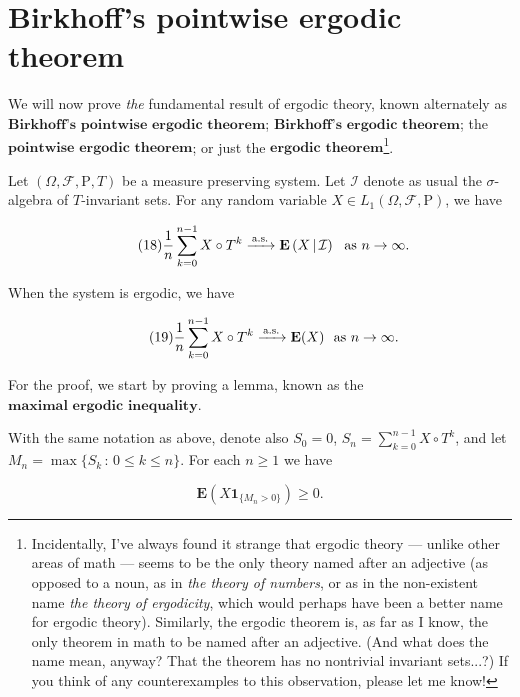 \section{Birkhoff's pointwise ergodic theorem}
We will now prove \emph{the} fundamental result of ergodic
theory, known alternately as
$\textbf{Birkhoff's pointwise ergodic theorem}$;
$\textbf{Birkhoff's ergodic theorem}$; the
$\textbf{pointwise ergodic theorem}$; or just the
$\textbf{ergodic theorem}$\footnote{Incidentally, I've always found it strange that
ergodic theory --- unlike other areas of math ---
seems to be the only theory named after an adjective
(as opposed to a noun, as in \emph{the theory of numbers},
or as in the non-existent name \emph{the theory of
ergodicity}, which would perhaps have been a better
name for ergodic theory). Similarly, the ergodic
theorem is, as far as I know, the only theorem in math
to be named after an adjective. (And what does the
name mean, anyway? That the theorem has no nontrivial
invariant sets...?) If you think of any
counterexamples to this observation, please let me
know!}.

\begin{thm}
Let $(\Omega, \mathcal{F}, \mathrm{P}, T)$ be a
measure preserving system. Let $\mathcal{I}$ denote
as usual the $\sigma$-algebra of $T$-invariant sets.
For any random variable
$X \in L_1(\Omega, \mathcal{F}, \mathrm{P})$, we have

\begin{equation*} \tag{18}\label{eq:birkhoffergodic1}
\frac{1}{n} \sum_{k=0}^{n-1} X\circ T^k \xrightarrow[]{\textrm{\,a.s.\,}} \mathbf{E}\left(X\,|\,\mathcal{I}\right)\ \textrm{ as }n\to\infty.
\end{equation*}

\noindent When the system is ergodic, we have

\begin{equation*} \tag{19}\label{eq:birkhoffergodic2}
\frac{1}{n} \sum_{k=0}^{n-1} X\circ T^k \xrightarrow[]{\textrm{\,a.s.\,}} \mathbf{E}(X)\ \textrm{ as }n\to\infty.
\end{equation*}

\end{thm}

\noindent For the proof, we start by proving a lemma, known as
the $\textbf{maximal ergodic inequality}$.

\begin{lem}
\label{lem-ergodic-maximal}
With the same notation as above, denote also $S_0=0$,
$S_n  = \sum_{k=0}^{n-1} X\circ T^k$, and let
$M_n=\max\{ S_k \,:\,0\le k\le n\}$. For each $n\ge1$
we have

\[
\mathbf{E}(X \mathbf{1}_{\{M_n > 0 \}}) \ge 0.
\]

\end{lem}

